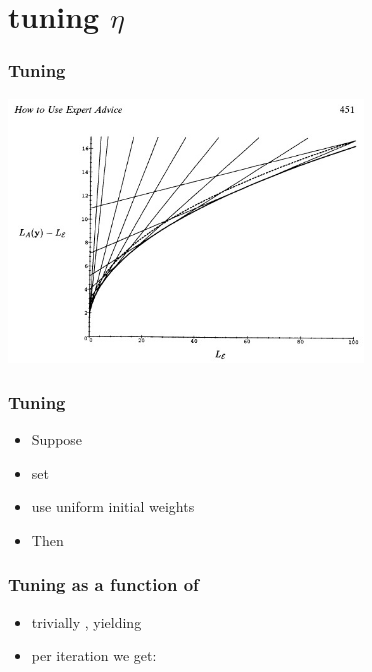 \documentclass[handout]{beamer}
\begin{document}
\section{tuning $\eta$}

\begin{frame}
\frametitle{Tuning \R{$\eta$}}
\includegraphics[height=7cm]{figures/beta-bounds.jpg}
\end{frame}

\begin{frame}
\frametitle{Tuning \R{$\eta$}}
\begin{itemize}
\item Suppose 
\item set
\R{\[
\eta = \ln \paren{ 1+ \sqrt{\frac{2 \ln N}{\upbnd{L}}}} \approx \sqrt{\frac{2 \ln N}{\upbnd{L}}}
\]}
\item use uniform initial weights 
\item Then
\end{itemize}
\end{frame}

\begin{frame}
\frametitle{Tuning \R{$\eta$} as a function of }
\begin{itemize}
\item trivially , yielding
\item per iteration we get:
\end{itemize}
\end{frame}
\end{document}
